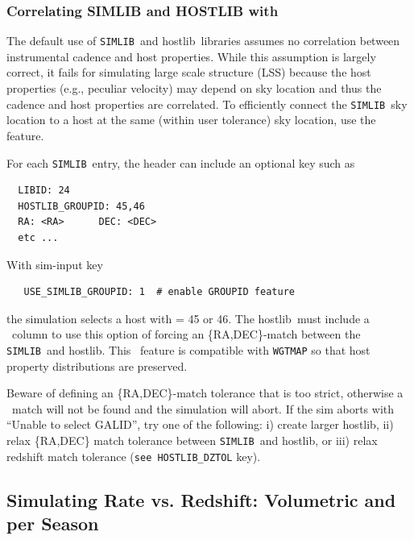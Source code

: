 \documentclass[12pt]{article}
\newcommand{\simlib}{{\tt SIMLIB}}
\newcommand{\hostlib}{{\sc hostlib}}
\begin{document}
{   \subsubsection{Correlating SIMLIB and HOSTLIB with {\groupid} }
   \label{sss:groupid}


The default use of \simlib\ and \hostlib\ libraries assumes no correlation
between instrumental cadence and host properties. While this assumption
is largely correct, it fails for simulating large scale structure (LSS)
because the host properties (e.g., peculiar velocity) may depend on 
sky location and thus the cadence and host properties are correlated.
To efficiently connect the \simlib\ sky location to a host at the 
same (within user tolerance) sky location, 
use the {\groupid} feature.

For each \simlib\ entry, the header can include an optional 
{\groupid} key such as
\begin{verbatim}
  LIBID: 24
  HOSTLIB_GROUPID: 45,46
  RA: <RA>      DEC: <DEC>
  etc ...
\end{verbatim}
%
With sim-input key 
\begin{verbatim}
   USE_SIMLIB_GROUPID: 1  # enable GROUPID feature 
\end{verbatim}
%
the simulation selects a host with {\groupid} = 45 or 46.
The \hostlib\ must include a \groupid\ column to use
this option of forcing an \{RA,DEC\}-match between the 
\simlib\ and \hostlib.
This \groupid\  feature is compatible with {\tt WGTMAP} so
that host property distributions are preserved.

Beware of defining an \{RA,DEC\}-match tolerance that is too strict, 
otherwise a \groupid\  match will not be found and the 
simulation will abort. If the sim aborts with ``Unable to select GALID'',
try one of the following: 
i) create larger \hostlib,
ii) relax \{RA,DEC\} match tolerance between \simlib\ and \hostlib, or
iii) relax redshift match tolerance ({\tt see HOSTLIB\_DZTOL} key).


   \clearpage
 \subsection{Simulating Rate vs. Redshift: Volumetric and per Season}
 \label{subsec:DNDZ}

}
\end{document}
